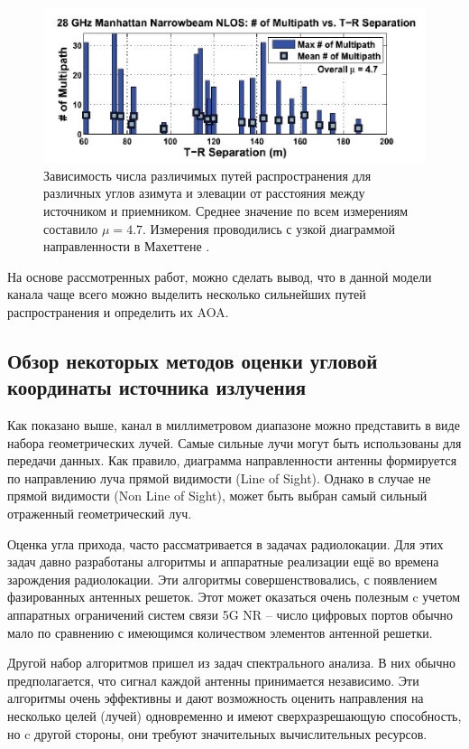 \begin{figure}[ht]
    \centering
    \includegraphics[width=0.8\linewidth]{figs/fig3.2}
    \caption{
        Зависимость числа различимых путей распространения для различных углов азимута и элевации от расстояния между источником и приемником.
        Среднее значение по всем измерениям составило $\mu=4.7$. Измерения проводились с узкой диаграммой направленности в Махеттене \cite{Rappaport2015}.}
    \label{fig:3.2}
\end{figure}

На основе рассмотренных работ, можно сделать вывод, что в данной модели
канала чаще всего можно выделить несколько сильнейших путей
распространения и определить их AOA.

\subsection{Обзор некоторых методов оценки угловой координаты источника излучения}

Как показано выше, канал в миллиметровом диапазоне можно представить в виде
набора геометрических лучей.  Самые сильные лучи могут быть
использованы для передачи данных. Как правило, диаграмма направленности
антенны формируется по направлению луча прямой видимости (Line of Sight).
Однако в случае не прямой видимости (Non Line of Sight), может быть
выбран самый сильный отраженный геометрический луч. 

Оценка угла прихода, часто рассматривается в задачах
радиолокации.  Для этих задач  давно разработаны алгоритмы и аппаратные реализации
ещё во времена зарождения радиолокации. Эти алгоритмы совершенствовались, с
появлением фазированных антенных решеток.  
Этот может оказаться очень  полезным c учетом  аппаратных ограничений систем
связи 5G NR -- число цифровых портов обычно мало по сравнению с имеющимся
количеством элементов антенной решетки. 

Другой набор алгоритмов пришел из задач спектрального анализа.
В них обычно предполагается, что сигнал каждой антенны принимается независимо.
Эти алгоритмы очень эффективны и дают возможность оценить направления на
несколько целей (лучей) одновременно и имеют сверхразрешающую способность, но c другой стороны, они требуют значительных вычислительных ресурсов.  

